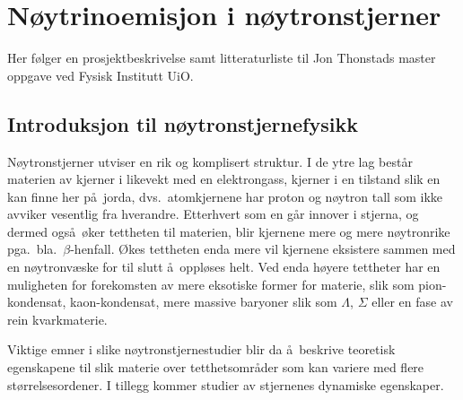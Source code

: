 


\pagestyle{plain}

\section*{N\o ytrinoemisjon i n\o ytronstjerner}

Her f\o lger en prosjektbeskrivelse samt litteraturliste til
Jon Thonstads master oppgave ved Fysisk Institutt UiO.


\subsection*{Introduksjon til n\o ytronstjernefysikk}







N\o ytronstjerner utviser en rik og komplisert struktur.
I de ytre lag best\aa r materien 
av kjerner i likevekt med en elektrongass, 
kjerner i en tilstand slik en kan finne her p\aa\ jorda, 
dvs.\ atomkjernene har proton og n\o ytron tall som ikke
avviker vesentlig fra hverandre. 
Etterhvert som en g\aa r innover i stjerna, og dermed
ogs\aa\ \o ker tettheten til materien, blir kjernene mere
og mere n\o ytronrike pga.\ bla.\ $\beta$-henfall.
\O kes tettheten enda mere  
vil kjernene eksistere sammen med en n\o ytronv\ae ske for til
slutt \aa\ oppl\o ses helt. Ved enda h\o yere tettheter har
en muligheten for forekomsten av mere eksotiske former
for materie, slik som pion-kondensat, kaon-kondensat,
mere massive baryoner slik som $\Lambda$, $\Sigma$ eller
en fase av rein kvarkmaterie.

Viktige emner i slike n\o ytronstjernestudier blir da
\aa\ beskrive teoretisk egenskapene
til slik materie over tetthetsomr\aa der som kan variere
med flere st\o rrelsesordener. I tillegg kommer studier
av stjernenes dynamiske egenskaper.

